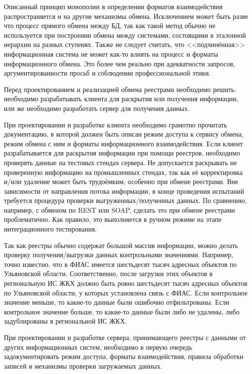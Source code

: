 Описанный принцип монополии в определении форматов взаимодействия распространяется и на другие механизмы обмена.
Исключением может быть разве что процесс прямого обмена между БД, так как такой метод обычно не используется при построении обмена между системами, состоящими в эталонной иерархии на разных ступенях.
Также не следует считать, что <<подчинённая>> информационная система не может как-то влиять на процесс и форматы информационного обмена.
Это более чем реально при адекватности запросов, аргументированности просьб и соблюдении профессиональной этики.

Перед проектированием и реализацией обмена реестрами необходимо решить: необходимо разрабатывать клиента для раскрытия или получения информации, или же необходимо разработать сервер для получения данных.

При проектировании и разработке клиента необходимо грамотно прочитать документацию, в которой должен быть описан режим доступа к сервису обмена, режим обмена с ним и форматы информационного взаимодействия.
Если клиент разрабатывается для раскрытия информации при помощи реестров, необходимо проверять данные на тестовых стендах сервера.
Не допускается раскрывать не проверенную информацию на промышленных стендах, так как её корректировка и/или удаление может быть трудоёмким, особенно при обмене реестрами.
Вне зависимости от направления потока информации, в конце проведения испытаний требуется процедура проверки выгруженных/полученных данных.
По сравнению, например, с обменом по REST или SOAP, сделать это при обмене реестрами проблематично.
Как правило, это выполняется в ручном режиме на этапе интеграционного тестирования.

Так как реестры обычно содержат большой массив информации, можно делать проверку получения/выгрузки данных контрольными значениями.
Например, точно известно, что в ФИАС имеется шестьдесят тысяч адресных объектов по Ульяновской области.
Соответственно, после загрузки этих объектов в региональную ИС ЖКХ должно быть ровно шестьдесят тысяч адресных объектов по Ульяновской области, у которых установлена связь с ФИАС. Если контрольное значение меньше, то какие-то данные были ошибочно отфильтрованы. Если контрольное значение больше, то какие-то данные были либо не удалены, либо задублированы в региональной ИС ЖКХ.

При проектировании и разработке сервера, принимающего реестры с данными от других информационных систем, необходимо в первую очередь задокументировать режим доступа, форматы взаимодействия, правила обработки записей и механизмы проверки загружаемых данных.


